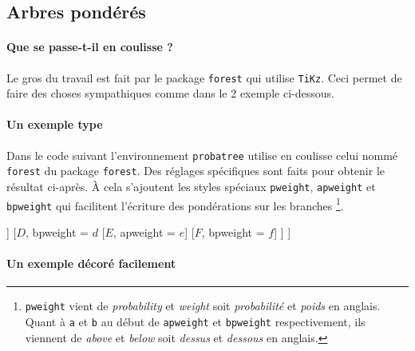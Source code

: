 \documentclass[12pt,a4paper]{article}
\begin{document}

\subsection{Arbres pondérés}

\paragraph{Que se passe-t-il en coulisse ?}

Le gros du travail est fait par le package \verb+forest+ qui utilise \verb+TiKz+. Ceci permet de faire des choses sympathiques comme dans le 2\ieme{} exemple ci-dessous.




\paragraph{Un exemple type}

Dans le code suivant l'environnement \verb+probatree+ utilise en coulisse celui nommé \verb+forest+ du package \verb+forest+. Des réglages spécifiques sont faits pour obtenir le résultat ci-après.
À cela s'ajoutent les styles spéciaux \verb+pweight+, \verb+apweight+ et \verb+bpweight+ qui facilitent l'écriture des pondérations sur les branches
\footnote{
    \texttt{pweight} vient de \emph{\og probability \fg} et \emph{\og weight\fg} soit \emph{\og probabilité \fg} et \emph{\og poids\fg} en anglais.
    Quant à \texttt{a} et \texttt{b} au début de \texttt{apweight} et \texttt{bpweight} respectivement, ils viennent de \emph{\og above \fg} et \emph{\og below\fg} soit \emph{\og dessus \fg} et \emph{\og dessous\fg} en anglais.
}.

\begin{latexex}
\begin{probatree}
[
    [$A$, pweight = $a$
        [$B$, pweight = $b$]
        [$C$, pweight = $c$]
    ]
    [$D$, bpweight = $d$
        [$E$, apweight = $e$]
        [$F$, bpweight = $f$]
    ]
]
\end{probatree}
\end{latexex}




\paragraph{Un exemple décoré facilement}
\end{document}
